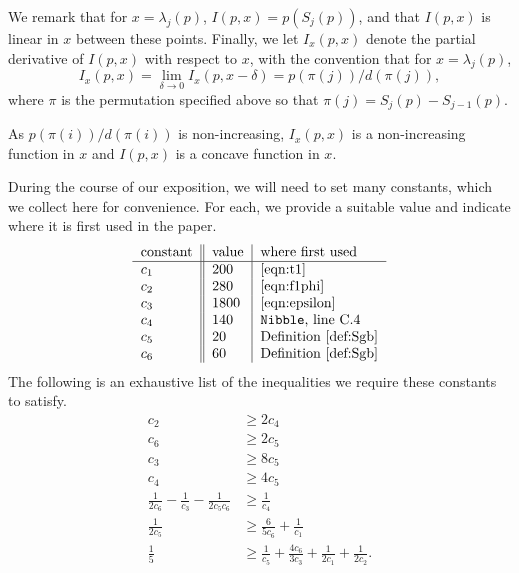 \documentclass[11pt]{article}
\newcommand{\setj}[2]{S_{#1} (#2)}
\newcommand{\lamj}[2]{\lambda_{#1} (#2)}
\begin{document}
We remark that for $x = \lamj{j}{p}$,
  $I (p,x) = p (\setj{j}{p})$, and that
  $I (p,x)$ is linear in $x$ between these points.
Finally, we let $I_{x} (p,x)$ denote the partial derivative of
  $I (p,x)$ with respect to $x$, with the convention that for
  $x = \lamj{j}{p}$,
\[
I_{x} (p,x) = \lim_{\delta\rightarrow 0}I_{x} (p,x - \delta ) =  p (\pi (j)) / d (\pi (j)),
\]
where $\pi$ is the permutation specified above
  so that $\pi (j) = \setj{j}{p} - \setj{j-1}{p}$.

As $p (\pi (i)) / d (\pi (i))$ is non-increasing,
  $I_{x} (p,x)$ is a non-increasing function in $x$ and
  $I (p,x)$ is a concave function in $x$.

During the course of our exposition, we will need to set many constants,
  which we collect here for convenience.
For each, we provide a suitable value and indicate where it is first used in the paper. 
\[
\begin{tabular}{l || l | l }
constant & value & where first used\\
\hline
$c_{1}$  & 200 & \eqref{eqn:t1}\\
$c_{2}$  & 280 & \eqref{eqn:f1phi}\\
$c_{3}$  & 1800 & \eqref{eqn:epsilon}\\
$c_{4}$  & 140 & \texttt{Nibble}, line C.4\\
$c_{5}$  & 20 & Definition~\ref{def:Sgb} \\
$c_{6}$  & 60 & Definition~\ref{def:Sgb}\\
\end{tabular}
\]
The following is an exhaustive list of the inequalities 
  we require these constants to satisfy.
\begin{align}
c_{2} & \geq 2 c_{4}  \label{eqn:c2geqc4}\\
c_{6} & \geq 2 c_{5} \label{eqn:c6geqc5}\\
c_{3} & \geq 8 c_{5} \label{eqn:c3geqc5}\\
c_{4} & \geq 4 c_{5} \label{eqn:c4geqc5}\\
\frac{1}{2 c_{6}} - \frac{1}{c_{3}} - \frac{1}{2 c_{5} c_{6}}& \geq \frac{1}{c_{4}}
\label{eqn:manyc1}
\\
\frac{1}{2 c_{5}} & \geq \frac{6}{5 c_{6}} + \frac{1}{c_{1}} \label{eqn:c5leqc1c6}\\
\frac{1}{5} & \geq 
\frac{1}{c_{5}} + \frac{4 c_{6}}{3 c_{3}} + \frac{1}{2 c_{1}} + \frac{1}{2 c_{2}}.
\label{eqn:manyc2}
\end{align}
\end{document}
